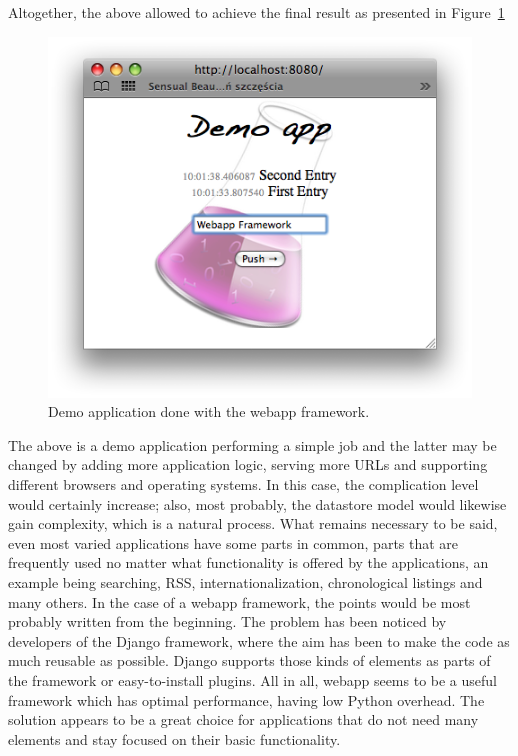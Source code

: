 \lstset{caption=Django template system example from the demo application.,label=code:template_sample}

Altogether, the above allowed to achieve the final result as presented in Figure~\ref{fig:webapp_sample}
\begin{figure}[ht]
\begin{center}
\includegraphics[scale=0.6]{img/webapp_sample.png}
\caption{Demo application done with the webapp framework.}
\label{fig:webapp_sample}
\end{center}
\end{figure}
The above is a demo application performing a simple job and the latter may be changed by adding more application logic, serving more URLs and supporting different browsers and operating systems. In this case, the complication level would certainly increase; also, most probably, the datastore model would likewise gain complexity, which is a natural process. What remains necessary to be said, even most varied applications have some parts in common, parts that are frequently used no matter what functionality is offered by the applications, an example being searching, RSS, internationalization, chronological listings and many others. In the case of a webapp framework, the points would be most probably written from the beginning. The problem has been noticed by developers of the Django framework, where the aim has been to make the code as much reusable as possible. Django supports those kinds of elements as parts of the framework or easy-to-install plugins. All in all, webapp seems to be a useful framework which has optimal performance, having low Python overhead. The solution appears to be a great choice for applications that do not need many elements  and stay focused on their basic functionality. 

